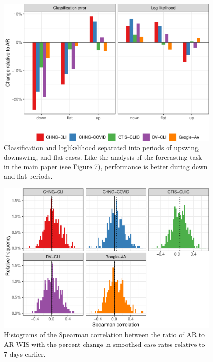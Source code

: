\clearpage

\begin{figure}

{\centering \includegraphics[width=\textwidth]{fig/hotspots-upswing-downswing-1} 

}

\caption{Classification and loglikelihood separated into periods of upswing, downswing, and flat cases. Like the analysis of the forecasting task in the main paper (see Figure 7), performance is better during down and flat periods.}\label{fig:hotspots-upswing-downswing}
\end{figure}

\clearpage

\begin{figure}

{\centering \includegraphics[width=\textwidth]{fig/cor-wis-ratio-1} 

}

\caption{Histograms of the Spearman correlation between the ratio of AR to AR WIS with the percent change in smoothed case rates relative to 7 days earlier.}\label{fig:cor-wis-ratio}
\end{figure}

